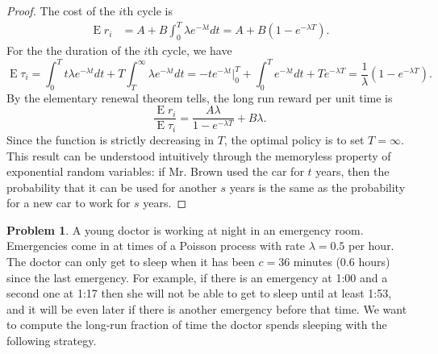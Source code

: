 \documentclass[oneside]{amsart}
\DeclareMathOperator{\E}{\mathrm{E}}
\theoremstyle{definition}
\newtheorem{prob}{Problem}
\begin{document}
\begin{proof}
The cost of the $i$th cycle is 
\begin{align*}
	\E r_i &= A + B  \int_0^T \lambda e^{-\lambda t} dt = A + B (1 - e^{-\lambda T}).
\end{align*}
For the the duration of the $i$th cycle, we have
\[
	\E \tau_i = \int_0^T t \lambda e^{-\lambda t}dt  + T \int_T^\infty \lambda e^{-\lambda t}dt 
	= - t e^{-\lambda t} \Big|_0^T + \int_0^T  e^{-\lambda t}dt +  T e^{-\lambda T}
	= \frac{1}{\lambda} (1 - e^{-\lambda T}).
\]
By the elementary renewal theorem tells, the long run reward per unit time is 
\[
	\frac{\E r_i}{\E \tau_i} = \frac{A \lambda}{1 - e^{-\lambda T}}  + B\lambda.
\]
Since the function is strictly decreasing in $T$, the optimal policy is to set $T = \infty$. This result can be understood intuitively through the memoryless property of exponential random variables: if Mr. Brown used the car for $t$ years, then the probability that it can be used for another $s$ years is the same as the probability for a new car to work for $s$ years. 
\end{proof}

\begin{prob}
A young doctor is working at night in an emergency room. Emergencies come in at times of a Poisson process with rate $\lambda=0.5$ per hour. The doctor can only get to sleep when it has been $c = 36$ minutes (0.6 hours) since the last emergency. For example, if there is an emergency at 1:00 and a second one at 1:17 then she will not be able to get to sleep until at least 1:53, and it will be even later if there is another emergency before that time. We want to compute the long-run fraction of time the doctor spends sleeping with the following strategy.
\end{prob}
\end{document}
